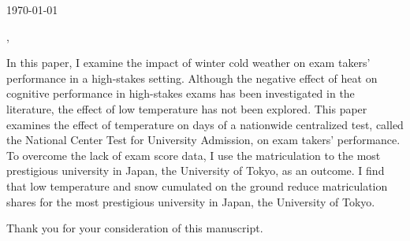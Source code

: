 \documentclass{jourcl}
\begin{document}
\large %

\noindent\makebox[\linewidth]{\rule{0.9\paperwidth}{0.4pt}}

\today


\vspace*{1\baselineskip}
\pPersonAddressing,

\pIntroduction

In this paper, I examine the impact of winter cold weather on exam takers' performance in a high-stakes setting.
Although the negative effect of heat on cognitive performance in high-stakes exams has been investigated in the literature, the effect of low temperature has not been explored.
This paper examines the effect of temperature on days of a nationwide centralized test, called the National Center Test for University Admission, on exam takers' performance.
To overcome the lack of exam score data, I use the matriculation to the most prestigious university in Japan, the University of Tokyo, as an outcome.
I find that low temperature and snow cumulated on the ground reduce matriculation shares for the most prestigious university in Japan, the University of Tokyo.

\pfinal\newline


\pconflictofinterest 

Thank you for your consideration of this manuscript.

\vspace{1cm}

\pvalediction\par

\psignature

\showSignature{\pSignaturePath}
\end{document}
